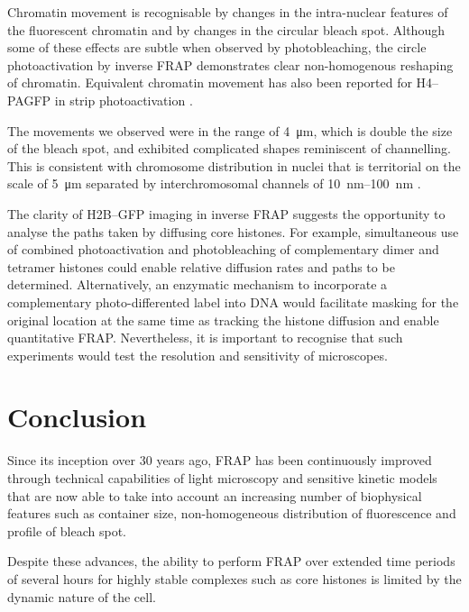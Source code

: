     Chromatin movement is recognisable
    by changes in the intra-nuclear features of the fluorescent chromatin
    and by changes in the circular bleach spot.
    Although some of these effects are subtle when observed by photobleaching,
    the circle photoactivation by inverse FRAP demonstrates
    clear non-homogenous reshaping of chromatin.
    Equivalent chromatin movement has also been reported
    for H4--PAGFP in strip photoactivation \cite{H4PAGFP-chromatin-movement}.

    The movements we observed were in the
    range of \SI{4}{\um}, which is double the size of the bleach spot,
    and exhibited complicated shapes reminiscent of channelling.
    This is consistent with chromosome distribution in nuclei that is
    territorial on the scale of \SI{5}{\um} \citep{sun2000size}
    separated by interchromosomal channels of
    \SIrange{10}{100}{\nm} \citep{gorisch2005histone}.

    The clarity of H2B--GFP imaging in inverse FRAP
    suggests the opportunity to analyse the
    paths taken by diffusing core histones.
    For example, simultaneous use of combined
    photoactivation and photobleaching
    of complementary dimer and tetramer histones could
    enable relative diffusion rates and paths to be determined.
    Alternatively, an enzymatic mechanism to incorporate a
    complementary photo-differented label
    into DNA  would facilitate masking for
    the original location at the same time as tracking the histone diffusion
    and enable quantitative FRAP.
    Nevertheless, it is important to recognise
    that such experiments would test the
    resolution and sensitivity of microscopes.

\section{Conclusion}

    Since its inception over 30 years ago, FRAP has been continuously
    improved
    through technical capabilities of light microscopy
    and sensitive kinetic models that are now able to take into account
    an increasing number of biophysical features such as container size,
    non-homogeneous distribution of fluorescence and profile of bleach spot.

    Despite these advances, the ability to perform FRAP
    over extended time periods of several hours for highly stable complexes
    such as core histones is limited by the dynamic nature of the cell.


